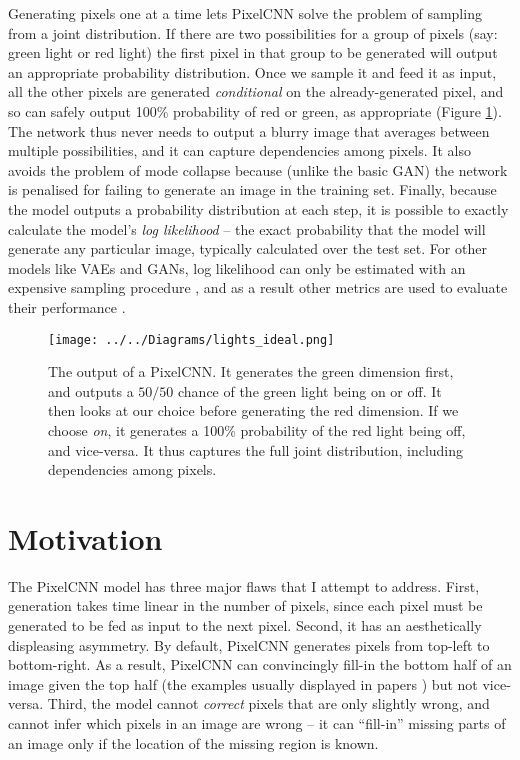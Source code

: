 \documentclass[11pt, a4paper]{book}
\newcommand{\nquote}[1]{``{#1}''}
\begin{document}
Generating pixels one at a time lets PixelCNN solve the problem of sampling from a joint distribution. If there are two possibilities for a group of pixels (say: green light or red light) the first pixel in that group to be generated will output an appropriate probability distribution. Once we sample it and feed it as input, all the other pixels are generated \emph{conditional} on the already-generated pixel, and so can safely output 100\% probability of red or green, as appropriate (Figure \ref{lightsideal}). The network thus never needs to output a blurry image that averages between multiple possibilities, and it can capture dependencies among pixels. It also avoids the problem of mode collapse because (unlike the basic GAN) the network is penalised for failing to generate an image in the training set. Finally, because the model outputs a probability distribution at each step, it is possible to exactly calculate the model's \emph{log likelihood} -- the exact probability that the model will generate any particular image, typically calculated over the test set. For other models like VAEs and GANs, log likelihood can only be estimated with an expensive sampling procedure \citep{likelihoodestimation}, and as a result other metrics are used to evaluate their performance \citep{ganmetrics}.

\begin{figure}
  \centering
  \texttt{[image: ../../Diagrams/lights\_ideal.png]}
  \caption[Output of a PixelCNN]{The output of a PixelCNN. It generates the green dimension first, and outputs a $50/50$ chance of the green light being on or off. It then looks at our choice before generating the red dimension. If we choose \emph{on}, it generates a 100\% probability of the red light being off, and vice-versa. It thus captures the full joint distribution, including dependencies among pixels.}
  \label{lightsideal}
\end{figure}

\section{Motivation}

The PixelCNN model has three major flaws that I attempt to address. First, generation takes time linear in the number of pixels, since each pixel must be generated to be fed as input to the next pixel. Second, it has an aesthetically displeasing asymmetry. By default, PixelCNN generates pixels from top-left to bottom-right. As a result, PixelCNN can convincingly fill-in the bottom half of an image given the top half (the examples usually displayed in papers \citep{pixelcnn1,??,??}) but not vice-versa. Third, the model cannot \emph{correct} pixels that are only slightly wrong, and cannot infer which pixels in an image are wrong -- it can \nquote{fill-in} missing parts of an image only if the location of the missing region is known.
\end{document}
